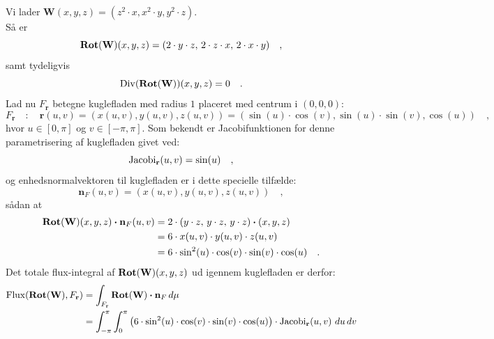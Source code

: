 \begin{example} \label{exampRotFeltFlux}
Vi lader $\mathbf{W}(x,y,z) = (z^{2}\cdot x, x^{2}\cdot y, y^{2}\cdot z)$. \\

 Så er
\begin{equation}
\operatorname{\mathbf{Rot}}(\mathbf{W})(x,y,z) = (2\cdot y \cdot z, \, 2\cdot z \cdot x, \, 2\cdot x \cdot y ) \quad,
\end{equation}
samt tydeligvis
\begin{equation}
\operatorname{Div}(\operatorname{\mathbf{Rot}}(\mathbf{W}))(x,y,z) = 0 \quad.
\end{equation}
Lad nu $F_{\mathbf{r}}$ betegne kuglefladen med radius $1$ placeret med centrum i $(0,0,0)$:
\begin{equation}
F_{\mathbf{r}} \quad : \quad \mathbf{r}(u,v) = (x(u,v), y(u,v), z(u,v)) = (\sin(u)\cdot \cos(v), \sin(u)\cdot \sin(v), \cos(u)) \quad ,
\end{equation}
hvor $u \in [0, \pi]$ og $v \in [-\pi, \pi]$. Som bekendt er Jacobifunktionen for denne parametrisering af kuglefladen givet ved:
\begin{equation}
\operatorname{Jacobi}_{\mathbf{r}}(u,v) = \sin(u) \quad ,
\end{equation}
og enhedsnormalvektoren til kuglefladen er i dette specielle tilfælde:
\begin{equation}
\mathbf{n}_{F}(u,v) = (x(u,v), y(u,v), z(u,v)) \quad ,
\end{equation}
sådan at
\begin{equation}
\begin{aligned}
\operatorname{\mathbf{Rot}}(\mathbf{W})(x,y,z)\bm{\cdot} \mathbf{n}_{F}(u,v) &= 2\cdot(y\cdot z, \, y\cdot z, \, y\cdot z ) \bm{\cdot} (x, y, z) \\
&= 6\cdot x(u,v) \cdot y(u,v) \cdot z(u,v) \\
&= 6 \cdot \sin^{2}(u) \cdot \cos(v) \cdot \sin(v) \cdot \cos(u) \quad .
\end{aligned}
\end{equation}
Det totale flux-integral af $\operatorname{\mathbf{Rot}}(\mathbf{W})(x,y,z)$ ud igennem kuglefladen er derfor:
\begin{equation} \label{eqIntegrat}
\begin{aligned}
\Flux(\Rot(\mathbf{W}), F_{\mathbf{r}}) &= \int_{F_{\mathbf{r}}}\Rot(\mathbf{W})\bm{\cdot} \mathbf{n}_{F} \, d\mu \\
&= \int_{-\pi}^{\pi}\int_{0}^{\pi} \left( 6 \cdot \sin^{2}(u) \cdot \cos(v) \cdot \sin(v) \cdot \cos(u)\right) \cdot \Jac_{\mathbf{r}}(u,v) \,\, du \, dv \\

\end{aligned}
\end{equation}
\end{example}
